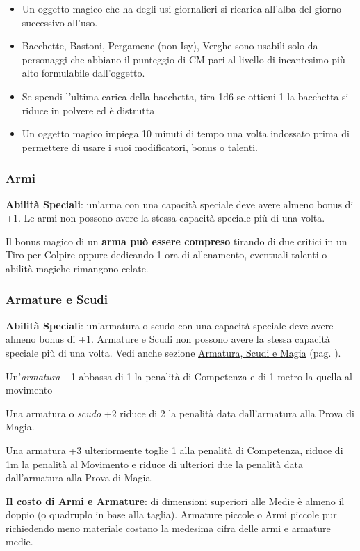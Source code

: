 \begin{multicols}{2}
\begin{itemize}[leftmargin=*]
\item
Un oggetto magico che ha degli usi giornalieri si ricarica all'alba del giorno successivo all'uso.
\item
Bacchette, Bastoni, Pergamene (non Isy), Verghe sono usabili solo da personaggi che abbiano il punteggio di CM pari al livello di incantesimo più alto formulabile dall'oggetto.
\item
Se spendi l'ultima carica della bacchetta, tira 1d6 se ottieni 1 la bacchetta si riduce in polvere ed è distrutta
\item
Un oggetto magico impiega 10 minuti di tempo una volta indossato prima di permettere di usare i suoi modificatori, bonus o talenti.

\end{itemize}

\subsubsection{Armi}

\textbf{Abilità Speciali}: un'arma con una capacità speciale deve avere almeno bonus di +1. Le armi non possono avere la stessa capacità speciale più di una volta.

Il bonus magico di un \textbf{arma può essere compreso} tirando di due critici in un Tiro per Colpire oppure dedicando 1 ora di allenamento, eventuali talenti o abilità magiche rimangono celate.

\subsubsection{Armature e Scudi}

\textbf{Abilità Speciali}: un'armatura o scudo con una capacità speciale deve avere almeno bonus di +1. Armature e Scudi non possono avere la stessa capacità speciale più di una volta. Vedi anche sezione \hyperlink{armaturaescudimagici}{Armatura, Scudi e Magia} (pag. \pageref{armaturaescudimagici}).

Un'\emph{armatura} +1 abbassa di 1 la penalità di Competenza e di 1 metro la quella al movimento

Una armatura o \emph{scudo} +2 riduce di 2 la penalità data dall'armatura alla Prova di Magia.

Una armatura +3 ulteriormente toglie 1 alla penalità di Competenza, riduce di 1m la penalità al Movimento e riduce di ulteriori due la penalità data dall'armatura alla Prova di Magia.

\textbf{Il costo di Armi e Armature}: di dimensioni superiori alle Medie è almeno il doppio (o quadruplo in base alla taglia). Armature piccole o Armi piccole pur richiedendo meno materiale costano la medesima cifra delle armi e armature medie.


\end{multicols}
